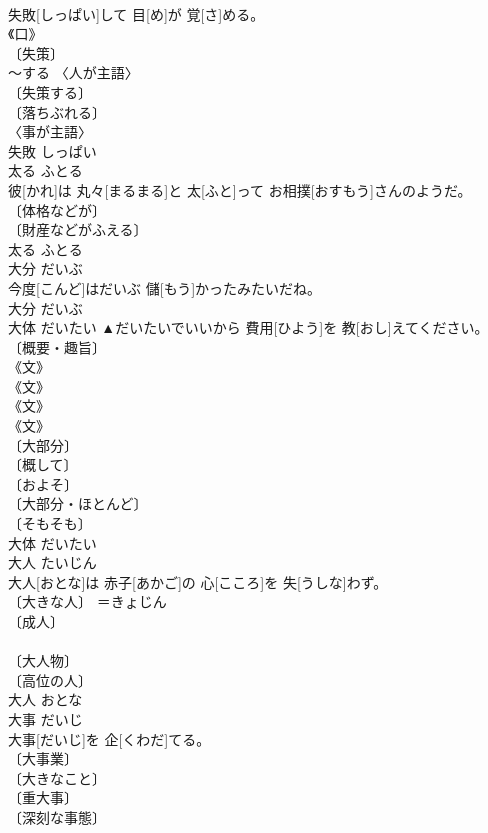 \documentclass[8pt]{extreport}
\begin{document}
\begin{CJK}{UTF8}{min}
\\	失敗[しっぱい]して 目[め]が 覚[さ]める。	
\\	《口》 
\\	〔失策〕 
\\	～する 〈人が主語〉 
\\	〔失策する〕 
\\	〔落ちぶれる〕 
\\	〈事が主語〉 
\\	失敗	しっぱい	
\\	太る	ふとる	
\\	彼[かれ]は 丸々[まるまる]と 太[ふと]って お相撲[おすもう]さんのようだ。	
\\	〔体格などが〕 
\\	〔財産などがふえる〕 
\\	太る	ふとる	
\\	大分	だいぶ	
\\	今度[こんど]はだいぶ 儲[もう]かったみたいだね。	
\\	大分	だいぶ	
\\	大体	だいたい	▲だいたいでいいから 費用[ひよう]を 教[おし]えてください。	
\\	〔概要・趣旨〕 
\\	《文》 
\\	《文》 
\\	《文》 
\\	《文》 
\\	〔大部分〕 
\\	〔概して〕 
\\	〔およそ〕 
\\	〔大部分・ほとんど〕 
\\	〔そもそも〕 
\\	大体	だいたい	
\\	大人	たいじん	
\\	大人[おとな]は 赤子[あかご]の 心[こころ]を 失[うしな]わず。	
\\	〔大きな人〕 ＝きょじん 
\\	〔成人〕 
\\	[＝おとな] 
\\	〔大人物〕 
\\	〔高位の人〕 
\\	大人	おとな	
\\	大事	だいじ	
\\	大事[だいじ]を 企[くわだ]てる。	
\\	〔大事業〕 
\\	〔大きなこと〕 
\\	〔重大事〕 
\\	〔深刻な事態〕 

\end{CJK}
\end{document}
